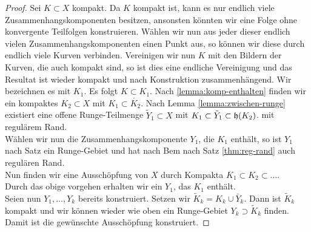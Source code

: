 \begin{proof}
  Sei $K \subset X$ kompakt. Da $K$ kompakt ist, kann es nur endlich
  viele Zusammenhangskomponenten besitzen, ansonsten könnten wir eine
  Folge ohne konvergente Teilfolgen konstruieren. Wählen wir nun aus
  jeder dieser endlich vielen Zusammenhangskomponenten einen Punkt
  aus, so können wir diese durch endlich viele Kurven
  verbinden. Vereinigen wir nun $K$ mit den Bildern der Kurven, die
  auch kompakt sind, so ist dies eine endliche Vereinigung und das
  Resultat ist wieder kompakt und nach Konstruktion
  zusammenhängend. Wir bezeichnen es mit $K_1$. Es folgt $K \subset
  K_1$. Nach \ref{lemma:komp-enthalten} finden wir ein kompaktes $K_2
  \subset X$ mit $K_1 \subset \mathring{K_2}$. Nach Lemma
  \ref{lemma:zwischen-runge}
  existiert eine offene Runge-Teilmenge $\tilde Y_1 \subset X$ mit
  $K_1 \subset \tilde Y_1 \subset \mathfrak{h}(K_2)$. mit regulärem Rand. \\
  Wählen wir nun die Zusammenhangskomponente $Y_1$, die $K_1$ enthält,
  so ist $Y_1$ nach Satz \label{thm:runge-zshkomp} ein Runge-Gebiet
  und hat nach Bem nach Satz \ref{thm:reg-rand} auch regulären Rand. \\
  Nun finden wir eine Ausschöpfung von $X$ durch Kompakta $K_1 \subset
  K_2 \subset \dots$. \\
  Durch das obige vorgehen erhalten wir ein $Y_1$, das $K_1$
  enthält.\\
  Seien nun $Y_1, \dots, Y_k$ bereits konstruiert. Setzen wir $\tilde
  K_k = K_k \cup \bar Y_k$. Dann ist $\tilde K_k$ kompakt und wir
  können wieder wie oben ein Runge-Gebiet $Y_k \supset \tilde K_k$
  finden.\\
  Damit ist die gewünschte Ausschöpfung konstruiert.
\end{proof}

